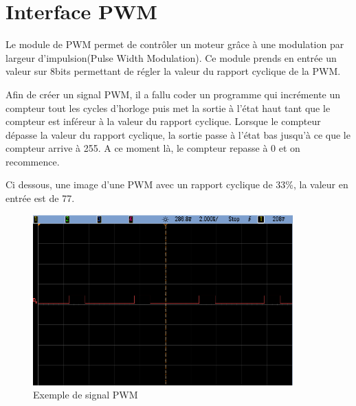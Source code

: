\section{Interface PWM}
Le module de PWM permet de contrôler un moteur grâce à une modulation par largeur d'impulsion(Pulse Width Modulation). Ce module prends en entrée un valeur sur 8bits permettant de régler la valeur
du rapport cyclique de la PWM.

Afin de créer un signal PWM, il a fallu coder un programme qui incrémente un compteur tout les cycles d'horloge puis met la sortie à l'état haut tant que le compteur est 
inféreur à la valeur du rapport cyclique. Lorsque le compteur dépasse la valeur du rapport cyclique, la sortie passe à l'état bas jusqu'à ce que le compteur arrive à 255. A ce
moment là, le compteur repasse à 0 et on recommence.

Ci dessous, une image d'une PWM avec un rapport cyclique de 33\%, la valeur en entrée est de 77.

\begin{figure}[h]
\centering
\includegraphics[width=10cm]{img/PWM_3F.png}
\caption{Exemple de signal PWM}
\end{figure}
\pagebreak